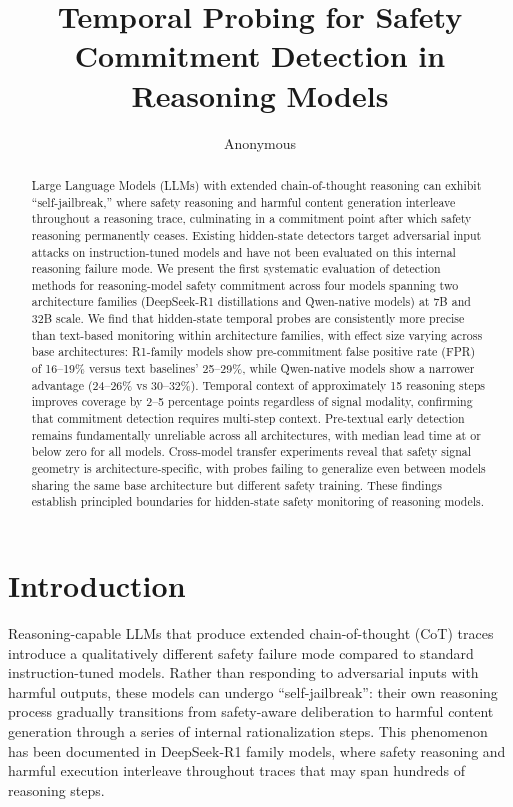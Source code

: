 \documentclass[11pt,a4paper]{article}
\title{Temporal Probing for Safety Commitment Detection in Reasoning Models}
\author{Anonymous}
\date{}
\begin{document}
\maketitle

\begin{abstract}
Large Language Models (LLMs) with extended chain-of-thought reasoning can exhibit ``self-jailbreak,'' where safety reasoning and harmful content generation interleave throughout a reasoning trace, culminating in a commitment point after which safety reasoning permanently ceases. Existing hidden-state detectors target adversarial input attacks on instruction-tuned models and have not been evaluated on this internal reasoning failure mode. We present the first systematic evaluation of detection methods for reasoning-model safety commitment across four models spanning two architecture families (DeepSeek-R1 distillations and Qwen-native models) at 7B and 32B scale. We find that hidden-state temporal probes are consistently more precise than text-based monitoring within architecture families, with effect size varying across base architectures: R1-family models show pre-commitment false positive rate (FPR) of 16--19\% versus text baselines' 25--29\%, while Qwen-native models show a narrower advantage (24--26\% vs 30--32\%). Temporal context of approximately 15 reasoning steps improves coverage by 2--5 percentage points regardless of signal modality, confirming that commitment detection requires multi-step context. Pre-textual early detection remains fundamentally unreliable across all architectures, with median lead time at or below zero for all models. Cross-model transfer experiments reveal that safety signal geometry is architecture-specific, with probes failing to generalize even between models sharing the same base architecture but different safety training. These findings establish principled boundaries for hidden-state safety monitoring of reasoning models.
\end{abstract}

\section{Introduction}

Reasoning-capable LLMs that produce extended chain-of-thought (CoT) traces introduce a qualitatively different safety failure mode compared to standard instruction-tuned models. Rather than responding to adversarial inputs with harmful outputs, these models can undergo ``self-jailbreak'': their own reasoning process gradually transitions from safety-aware deliberation to harmful content generation through a series of internal rationalization steps. This phenomenon has been documented in DeepSeek-R1 family models, where safety reasoning and harmful execution interleave throughout traces that may span hundreds of reasoning steps.
\end{document}

